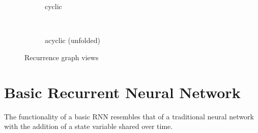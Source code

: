 \newsavebox{\recurrent}
\newsavebox{\recurrentuf}
\begin{figure}[H]
  \centering
  \begin{subfigure}[]{\wd\recurrent}
    \begin{center}
      \usebox{\recurrent}
    \end{center}
    \caption{cyclic}
    \label{fig:recurrent}
  \end{subfigure}
  ~
  \begin{subfigure}[]{\wd\recurrentuf}
    \begin{center}
      \usebox{\recurrentuf}
    \end{center}
    \caption{acyclic (unfolded)}
    \label{fig:recurrent_uf}
  \end{subfigure}
  \caption{Recurrence graph views}
  \label{fig:recurrence}
\end{figure}


\section{Basic Recurrent Neural Network}

The functionality of a basic RNN resembles that of a traditional neural network with the addition of a state variable shared over time.



